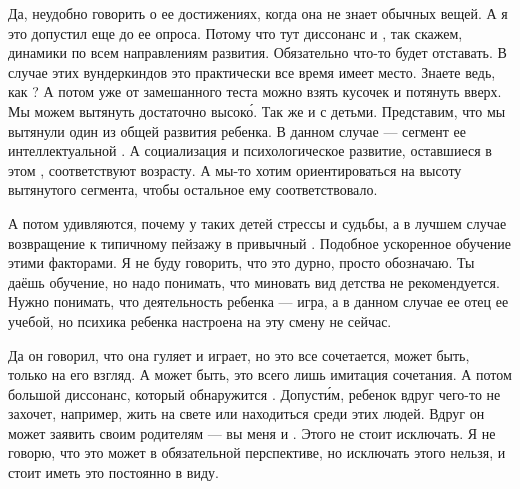 Да, неудобно говорить о ее достижениях, когда она не знает обычных вещей. А я это допустил еще до ее опроса. Потому что тут  диссонанс и , так скажем, динамики по всем направлениям развития. Обязательно что-то будет отставать. В случае этих вундеркиндов это практически все время имеет место. Знаете ведь, как  ? А потом уже от замешанного теста можно взять кусочек и потянуть вверх. Мы можем вытянуть достаточно высок\'{о}. Так же и с детьми. Представим, что мы вытянули один  из общей  развития ребенка. В данном случае --- сегмент ее интеллектуальной . А социализация и психологическое развитие, оставшиеся в этом , соответствуют возрасту. А мы-то хотим ориентироваться на высоту вытянутого сегмента, чтобы остальное ему соответствовало.

А потом удивляются, почему у таких детей стрессы и  судьбы, а в лучшем случае возвращение к типичному пейзажу в привычный  . Подобное ускоренное обучение  этими факторами. Я не буду говорить, что это дурно, просто обозначаю. Ты даёшь обучение, но надо понимать, что миновать вид детства не рекомендуется. Нужно понимать, что  деятельность ребенка --- игра, а в данном случае ее отец  ее учебой, но психика ребенка настроена на эту смену не сейчас.

Да он говорил, что она гуляет и играет, но это все сочетается, может быть, только на его взгляд. А может быть, это всего лишь имитация сочетания. А потом  большой диссонанс, который обнаружится . Допуст\'{и}м, ребенок вдруг чего-то не захочет, например, жить на свете или находиться среди этих людей. Вдруг он может заявить своим родителям --- вы меня  и . Этого не стоит исключать. Я не говорю, что это может  в обязательной перспективе, но исключать этого нельзя, и стоит иметь это постоянно в виду.

